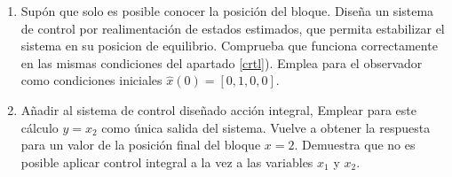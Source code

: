 \documentclass[10pt,a4paper]{article}
\begin{document}
\begin{enumerate}
\begin{enumerate}
\item Supón que solo es posible conocer la posición del bloque. Diseña un sistema de control por realimentación de estados estimados, que permita estabilizar el sistema en su posicion de equilibrio. Comprueba que funciona correctamente en las mismas condiciones del apartado \ref{crtl}). Emplea para el observador como condiciones iniciales $\hat{x}(0) = [0,1,0,0]$.

\item Añadir al sistema de control diseñado acción integral, Emplear para este cálculo $y = x_2$ como única salida del sistema.
Vuelve a obtener la respuesta para un valor de la posición final del bloque $x=2$. Demuestra que no es posible aplicar control integral a la vez a las variables $x_1$ y $x_2$.
\end{enumerate}
\end{enumerate}
\end{document}
